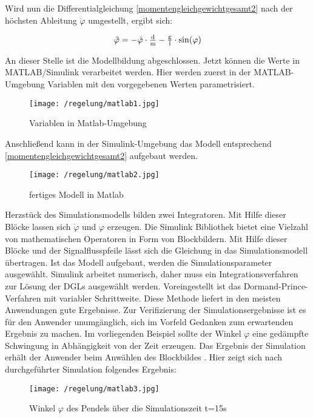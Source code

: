 Wird nun die Differentialgleichung \ref{momentengleichgewichtgesamt2} nach der höchsten Ableitung $\ddot\varphi$ umgestellt, ergibt sich:

\begin{align}
	\ddot\varphi = -\dot\varphi \cdot \tfrac{\i{d}}{\i{m}} - \tfrac{\i{g}}{\i{l}} \cdot \si{sin}(\varphi)
	\label{diffgleichung} 
\end{align}

An dieser Stelle ist die Modellbildung abgeschlossen. Jetzt können die Werte in MATLAB/Simulink  verarbeitet werden.
Hier werden zuerst in der MATLAB-Umgebung Variablen mit den vorgegebenen Werten parametrisiert.

\begin{figure}[h]
	\centering
	\texttt{[image: /regelung/matlab1.jpg]}
	\label{fig:matlab1}
	\caption{Variablen in Matlab-Umgebung}
\end{figure}

Anschließend kann in der Simulink-Umgebung das Modell entsprechend \ref{momentengleichgewichtgesamt2} aufgebaut werden.

\begin{figure}[h]
	\centering
	\texttt{[image: /regelung/matlab2.jpg]}
	\label{fig:matlab2}
	\caption{fertiges Modell in Matlab}
\end{figure}

Herzstück des Simulationsmodells bilden zwei Integratoren.
Mit Hilfe dieser Blöcke lassen sich  $\dot\varphi$ und $\varphi$ erzeugen.
Die Simulink Bibliothek bietet eine Vielzahl von mathematischen Operatoren in Form von Blockbildern.
Mit Hilfe dieser Blöcke und der Signalflusspfeile lässt sich die Gleichung in das Simulationsmodell übertragen.
Ist das Modell aufgebaut, werden die Simulationsparameter ausgewählt. 
Simulink arbeitet numerisch, daher muss ein Integrationsverfahren zur Lösung der DGLs ausgewählt werden. Voreingestellt ist das Dormand-Prince-Verfahren mit variabler Schrittweite.
Diese Methode liefert in den meisten Anwendungen gute Ergebnisse. \autocite[S.~6]{scherf2010}
Zur Verifizierung der Simulationsergebnisse ist es für den Anwender unumgänglich, sich im Vorfeld Gedanken zum erwartenden Ergebnis zu machen.
Im vorliegenden Beispiel sollte der Winkel $\varphi$ eine gedämpfte Schwingung in Abhängigkeit von der Zeit erzeugen.
Das Ergebnis der Simulation erhält der Anwender beim Anwählen des Blockbildes \grqq.
Hier zeigt sich nach durchgeführter Simulation folgendes Ergebnis:

\begin{figure}[h]
	\centering
	\texttt{[image: /regelung/matlab3.jpg]}
	\label{fig:matlab3}
	\caption{ Winkel $\varphi$ des Pendels über die Simulationszeit t=15s}
\end{figure}

